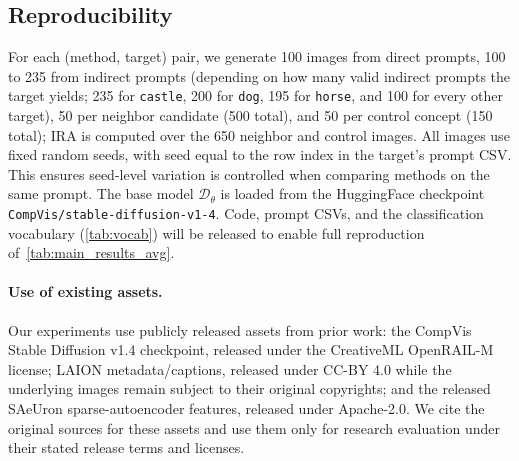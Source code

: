 \subsection{Reproducibility}
\label{app:reproducibility}
For each (method, target) pair, we generate 100 images from direct prompts, 100 to 235 from indirect prompts (depending on how many valid indirect prompts the target yields; 235 for \texttt{castle}, 200 for \texttt{dog}, 195 for \texttt{horse}, and 100 for every other target), 50 per neighbor candidate (500 total), and 50 per control concept (150 total); IRA is computed over the 650 neighbor and control images. All images use fixed random seeds, with seed equal to the row index in the target's prompt CSV. This ensures seed-level variation is controlled when comparing methods on the same prompt.
The base model $\mathcal{D}_\theta$ is loaded from the HuggingFace checkpoint \texttt{CompVis/stable-diffusion-v1-4}. Code, prompt CSVs, and the classification vocabulary (\cref{tab:vocab}) will be released to enable full reproduction of~\cref{tab:main_results_avg}.

\paragraph{Use of existing assets.}
Our experiments use publicly released assets from prior work: the CompVis Stable Diffusion v1.4 checkpoint, released under the CreativeML OpenRAIL-M license; LAION metadata/captions, released under CC-BY 4.0 while the underlying images remain subject to their original copyrights; and the released SAeUron sparse-autoencoder features, released under Apache-2.0. We cite the original sources for these assets and use them only for research evaluation under their stated release terms and licenses.